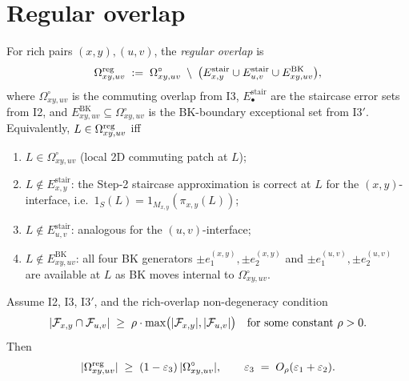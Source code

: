 \section{Regular overlap}\label{sec:regular-overlap}

\begin{definition}\label{def:regular-overlap}
For rich pairs $(x,y),(u,v)$, the \emph{regular overlap} is
\[
  \Omega^{\mathrm{reg}}_{xy,uv}\;:=\;\Omega^{\circ}_{xy,uv}\;\setminus\;\bigl(E^{\mathrm{stair}}_{x,y}\cup E^{\mathrm{stair}}_{u,v}\cup E^{\mathrm{BK}}_{xy,uv}\bigr),
\]
where $\Omega^{\circ}_{xy,uv}$ is the commuting overlap from \textsc{I3},
$E^{\mathrm{stair}}_\bullet$ are the staircase error sets from \textsc{I2},
and $E^{\mathrm{BK}}_{xy,uv}\subseteq\Omega^{\circ}_{xy,uv}$ is the
BK-boundary exceptional set from \textsc{I3$'$}. Equivalently,
$L\in\Omega^{\mathrm{reg}}_{xy,uv}$ iff
\begin{enumerate}[nosep,label=(R\arabic*)]
  \item $L\in\Omega^{\circ}_{xy,uv}$ (local 2D commuting patch at $L$);
  \item $L\notin E^{\mathrm{stair}}_{x,y}$: the Step-2 staircase approximation
  is correct at $L$ for the $(x,y)$-interface, i.e.\
  $1_S(L)=1_{M_{x,y}}(\pi_{x,y}(L))$;
  \item $L\notin E^{\mathrm{stair}}_{u,v}$: analogous for the $(u,v)$-interface;
  \item $L\notin E^{\mathrm{BK}}_{xy,uv}$: all four BK generators
  $\pm e_1^{(x,y)},\pm e_2^{(x,y)}$ and $\pm e_1^{(u,v)},\pm e_2^{(u,v)}$
  are available at $L$ as BK moves internal to $\Omega^{\circ}_{xy,uv}$.
\end{enumerate}
\end{definition}

\begin{lemma}\label{lem:omega-reg-size}
Assume \textsc{I2}, \textsc{I3}, \textsc{I3$'$}, and the rich-overlap
non-degeneracy condition
\begin{equation}\label{eq:rho-nondeg}
  |\mathcal{F}_{x,y}\cap\mathcal{F}_{u,v}|\;\ge\;\rho\cdot\max\bigl(|\mathcal{F}_{x,y}|,|\mathcal{F}_{u,v}|\bigr)
  \quad\text{for some constant $\rho>0$.}
\end{equation}
Then
\[
  |\Omega^{\mathrm{reg}}_{xy,uv}|\;\ge\;(1-\varepsilon_3)\,|\Omega^{\circ}_{xy,uv}|,
  \qquad
  \varepsilon_3\;=\;O_\rho(\varepsilon_1+\varepsilon_2).
\]
\end{lemma}

